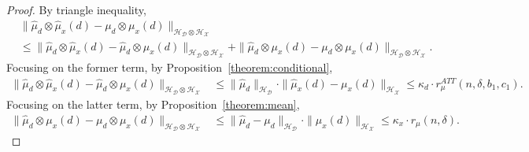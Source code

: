 \begin{proof}
By triangle inequality,
\begin{align*}
    &\|\hat{\mu}_d\otimes \hat{\mu}_x(d)-\mu_d\otimes \mu_x(d)\|_{\mathcal{H}_{\mathcal{D}}\otimes \mathcal{H}_{\mathcal{X}}} \\
    &\leq \|\hat{\mu}_d\otimes \hat{\mu}_x(d)-\hat{\mu}_d\otimes \mu_x(d)\|_{\mathcal{H}_{\mathcal{D}}\otimes \mathcal{H}_{\mathcal{X}}} + 
    \|\hat{\mu}_d\otimes \mu_x(d)-\mu_d\otimes \mu_x(d)\|_{\mathcal{H}_{\mathcal{D}}\otimes \mathcal{H}_{\mathcal{X}}}.
\end{align*}
Focusing on the former term, by Proposition~\ref{theorem:conditional},
\begin{align*}
    \|\hat{\mu}_d\otimes \hat{\mu}_x(d)-\hat{\mu}_d\otimes \mu_x(d)\|_{\mathcal{H}_{\mathcal{D}}\otimes \mathcal{H}_{\mathcal{X}}}
    &\leq  \|\hat{\mu}_d\|_{\mathcal{H}_{\mathcal{D}}}\cdot \|\hat{\mu}_x(d)-\mu_x(d)\|_{\mathcal{H}_{\mathcal{X}}}\leq \kappa_d \cdot r^{ATT}_{\mu}(n,\delta,b_1,c_1).
\end{align*}
Focusing on the latter term, by Proposition~\ref{theorem:mean},
\begin{align*}
      \|\hat{\mu}_d\otimes \mu_x(d)-\mu_d\otimes \mu_x(d)\|_{\mathcal{H}_{\mathcal{D}}\otimes \mathcal{H}_{\mathcal{X}}}
    &\leq \|\hat{\mu}_d-\mu_d\|_{\mathcal{H}_{\mathcal{D}}}\cdot  \|\mu_x(d)\|_{\mathcal{H}_{\mathcal{X}}} \leq  \kappa_x \cdot r_{\mu} (n,\delta).
\end{align*}
\end{proof}

